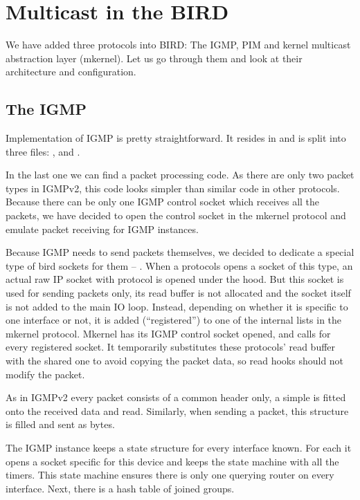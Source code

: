 \chapter{Multicast in the BIRD}

We have added three protocols into BIRD: The IGMP, PIM and kernel multicast
abstraction layer (mkernel). Let us go through them and look at their architecture and configuration.

\section{The IGMP}

Implementation of IGMP is pretty straightforward. It resides in
 and is split into three files: ,
 and .

In the last one we can find a packet processing code. As there are only two
packet types in IGMPv2, this code looks simpler than similar code in other
protocols. Because there can be only one IGMP control socket which receives all
the packets, we have decided to open the control socket in the mkernel protocol
and emulate packet receiving for IGMP instances.

Because IGMP needs to send packets themselves, we decided to dedicate a special
type of bird sockets for them -- . When a protocols opens
a socket of this type, an actual raw IP socket with protocol
 is opened under the hood. But this socket is used for
sending packets only, its read buffer is not allocated and the socket itself is
not added to the main IO loop. Instead, depending on whether it is specific to
one interface or not, it is added (``registered'') to one of the internal lists
in the mkernel protocol. Mkernel has its IGMP control socket opened, and calls
 for every registered socket. It temporarily substitutes these
protocols' read buffer with the shared one to avoid copying the packet data, so
read hooks should not modify the packet.

As in IGMPv2 every packet consists of a common header only, a simple
 is fitted onto the received data and read. Similarly,
when sending a packet, this structure is filled and sent as bytes.

The IGMP instance keeps a state structure  for every
interface known. For each it opens a socket specific for this device and keeps
the state machine with all the timers. This state machine ensures there is only
one querying router on every interface. Next, there is a hash table of joined
groups.

